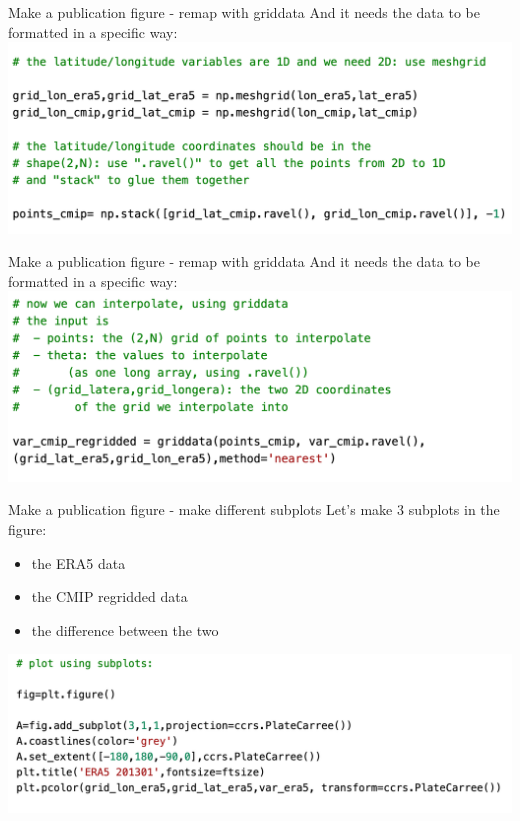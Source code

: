 \begin{frame}{\insertsectionnumber{ |} Make a publication figure - remap with griddata} 
    And it needs the data to be formatted in a specific way:
    \includegraphics[scale=0.35]{images/Script5_step2.png}
\end{frame}


\begin{frame}{\insertsectionnumber{ |} Make a publication figure - remap with griddata}
    And it needs the data to be formatted in a specific way:
    \includegraphics[scale=0.35]{images/Script5_step3.png}
\end{frame}


\begin{frame}{\insertsectionnumber{ |} Make a publication figure - make different subplots} 
    Let's make 3 subplots in the figure: 
    \begin{itemize}
        \item the ERA5 data
        \item the CMIP regridded data
        \item the difference between the two
    \end{itemize}
        \vspace{0.5cm}
    \includegraphics[scale=0.35]{images/Script5_step4.png}
\end{frame}


